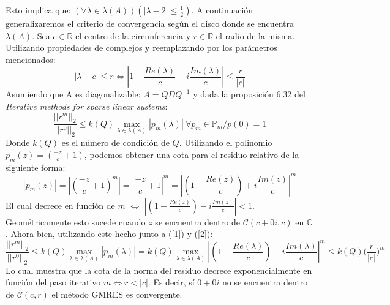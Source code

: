 \documentclass{endm}
\begin{document}
Esto implica que: $(\forall \lambda \in \lambda(A))(|\lambda-2|\leq \frac{1}{2})$. A continuación generalizaremos el criterio de convergencia según el disco donde se encuentra $\lambda(A)$. Sea $c \in \mathbb{R}$ el centro de la circunferencia y $r \in \mathbb{R}$ el radio de la misma. Utilizando propiedades de complejos y reemplazando por los parámetros mencionados:
\begin{equation}\label{1}
|\lambda-c| \leq r \Leftrightarrow |1-\frac{Re(\lambda)}{c}-i \frac{Im(\lambda)}{c}| \leq \frac{r}{|c|}
\end{equation}
Asumiendo que A es diagonalizable: $A=QDQ^{-1}$ y dada la proposici\'on 6.32 del 
\textit{Iterative methods for sparse linear systems}\cite{itermethods}:
\begin{equation}\label{2}
    \frac{||r^m||_2}{||r^0||_2} \leq k(Q) \max_{\lambda \in \lambda(A)}{|p_m(\lambda)|} \ \forall p_m \in \mathbb{P}_m / p(0)=1
\end{equation}
Donde $k(Q)$ es el número de condición de $Q$. Utilizando el polinomio $p_m(z)=(\frac{-z}{c}+1)$, podemos obtener una cota para el residuo relativo de la siguiente forma:
\begin{equation*}
    |p_m(z)| = |(\frac{-z}{c}+1)^m| = |\frac{-z}{c}+1|^m = |(1-\frac{Re(z)}{c})+i\frac{Im(z)}{c}|^m
\end{equation*}
El cual decrece en función de $m$ $\Leftrightarrow$ $|(1-\frac{Re(z)}{c})-i\frac{Im(z)}{c}| < 1$. Geométricamente esto sucede cuando $z$ se encuentra dentro de $\mathscr{C}(c+0i,c)$ en $\mathbb{C}$. Ahora bien, utilizando este hecho junto a (\ref{1}) y (\ref{2}):
\begin{equation}\label{3}
    \frac{||r^m||_2}{||r^0||_2} \leq k(Q) \max_{\lambda \in \lambda(A)}{|p_m(\lambda)|} = k(Q)\max_{\lambda \in \lambda(A)}{|(1-\frac{Re(\lambda)}{c})-i\frac{Im(\lambda)}{c}|^m} \leq k(Q)\big(\frac{r}{|c|}\big)^m
\end{equation}
Lo cual muestra que la cota de la norma del residuo decrece exponencialmente en función del paso iterativo $m \Leftrightarrow r<|c|$. Es decir, sí $ 0+0i$ no se encuentra dentro de $\mathscr{C}(c,r) $ el método GMRES es convergente.\\
\end{document}
